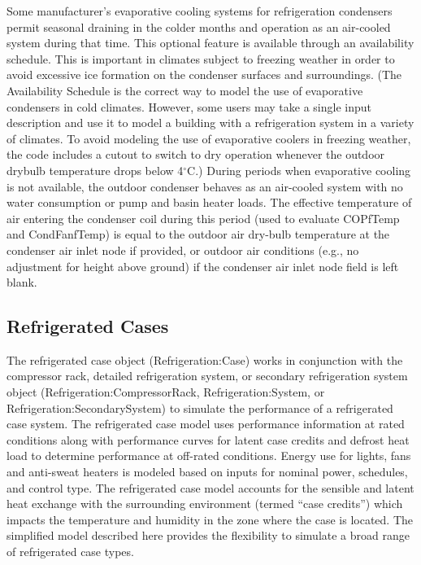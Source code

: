 Some manufacturer's evaporative cooling systems for refrigeration condensers permit seasonal draining in the colder months and operation as an air-cooled system during that time. This optional feature is available through an availability schedule. This is important in climates subject to freezing weather in order to avoid excessive ice formation on the condenser surfaces and surroundings. (The Availability Schedule is the correct way to model the use of evaporative condensers in cold climates. However, some users may take a single input description and use it to model a building with a refrigeration system in a variety of climates. To avoid modeling the use of evaporative coolers in freezing weather, the code includes a cutout to switch to dry operation whenever the outdoor drybulb temperature drops below 4\(^{\circ}\)C.) During periods when evaporative cooling is not available, the outdoor condenser behaves as an air-cooled system with no water consumption or pump and basin heater loads. The effective temperature of air entering the condenser coil during this period (used to evaluate COPfTemp and CondFanfTemp) is equal to the outdoor air dry-bulb temperature at the condenser air inlet node if provided, or outdoor air conditions (e.g., no adjustment for height above ground) if the condenser air inlet node field is left blank.

\subsection{Refrigerated Cases}\label{refrigerated-cases}

The refrigerated case object (Refrigeration:Case) works in conjunction with the compressor rack, detailed refrigeration system, or secondary refrigeration system object (Refrigeration:CompressorRack, Refrigeration:System, or Refrigeration:SecondarySystem) to simulate the performance of a refrigerated case system. The refrigerated case model uses performance information at rated conditions along with performance curves for latent case credits and defrost heat load to determine performance at off-rated conditions. Energy use for lights, fans and anti-sweat heaters is modeled based on inputs for nominal power, schedules, and control type. The refrigerated case model accounts for the sensible and latent heat exchange with the surrounding environment (termed ``case credits'') which impacts the temperature and humidity in the zone where the case is located. The simplified model described here provides the flexibility to simulate a broad range of refrigerated case types.


